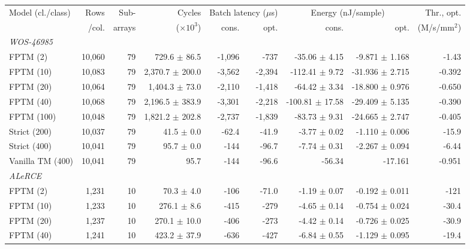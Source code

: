 \begin{tabular}{lrrrrrrrr}
\toprule
\multirow{2}{*}{Model (cl./class)} & Rows & Sub- & Cycles & \multicolumn{2}{c}{Batch latency ($\mu$s)} & \multicolumn{2}{c}{Energy (nJ/sample)} & Thr., opt. \\
 & /col. & arrays & ($\times10^3$) & cons. & opt. & cons. & opt. & (M/s/mm$^2$) \\
\midrule
\multicolumn{9}{l}{\textit{WOS-46985}} \\
FPTM (2) & 10,060 & 79 & 729.6 $\pm$ 86.5 & \hyp{1,096} & \hyp{737} & \hyp{35.06 $\pm$ 4.15} & \hyp{9.871 $\pm$ 1.168} & \hyp{1.43} \\
FPTM (10) & 10,083 & 79 & 2,370.7 $\pm$ 200.0 & \hyp{3,562} & \hyp{2,394} & \hyp{112.41 $\pm$ 9.72} & \hyp{31.936 $\pm$ 2.715} & \hyp{0.392} \\
FPTM (20) & 10,064 & 79 & 1,404.3 $\pm$ 73.0 & \hyp{2,110} & \hyp{1,418} & \hyp{64.42 $\pm$ 3.34} & \hyp{18.800 $\pm$ 0.976} & \hyp{0.650} \\
FPTM (40) & 10,068 & 79 & 2,196.5 $\pm$ 383.9 & \hyp{3,301} & \hyp{2,218} & \hyp{100.81 $\pm$ 17.58} & \hyp{29.409 $\pm$ 5.135} & \hyp{0.390} \\
FPTM (100) & 10,048 & 79 & 1,821.2 $\pm$ 202.8 & \hyp{2,737} & \hyp{1,839} & \hyp{83.73 $\pm$ 9.31} & \hyp{24.665 $\pm$ 2.747} & \hyp{0.405} \\
Strict (200) & 10,037 & 79 & 41.5 $\pm$ 0.0 & \hyp{62.4} & \hyp{41.9} & \hyp{3.77 $\pm$ 0.02} & \hyp{1.110 $\pm$ 0.006} & \hyp{15.9} \\
Strict (400) & 10,041 & 79 & 95.7 $\pm$ 0.0 & \hyp{144} & \hyp{96.7} & \hyp{7.74 $\pm$ 0.31} & \hyp{2.267 $\pm$ 0.094} & \hyp{6.44} \\
Vanilla TM (400) & 10,041 & 79 & 95.7 & \hyp{144} & \hyp{96.6} & \hyp{56.34} & \hyp{17.161} & \hyp{0.951} \\
\midrule
\multicolumn{9}{l}{\textit{ALeRCE}} \\
FPTM (2) & 1,231 & 10 & 70.3 $\pm$ 4.0 & \hyp{106} & \hyp{71.0} & \hyp{1.19 $\pm$ 0.07} & \hyp{0.192 $\pm$ 0.011} & \hyp{121} \\
FPTM (10) & 1,233 & 10 & 276.1 $\pm$ 8.6 & \hyp{415} & \hyp{279} & \hyp{4.65 $\pm$ 0.14} & \hyp{0.754 $\pm$ 0.024} & \hyp{30.4} \\
FPTM (20) & 1,237 & 10 & 270.1 $\pm$ 10.0 & \hyp{406} & \hyp{273} & \hyp{4.42 $\pm$ 0.14} & \hyp{0.726 $\pm$ 0.025} & \hyp{30.9} \\
FPTM (40) & 1,241 & 10 & 423.2 $\pm$ 37.9 & \hyp{636} & \hyp{427} & \hyp{6.84 $\pm$ 0.55} & \hyp{1.129 $\pm$ 0.095} & \hyp{19.4} \\

\end{tabular}
